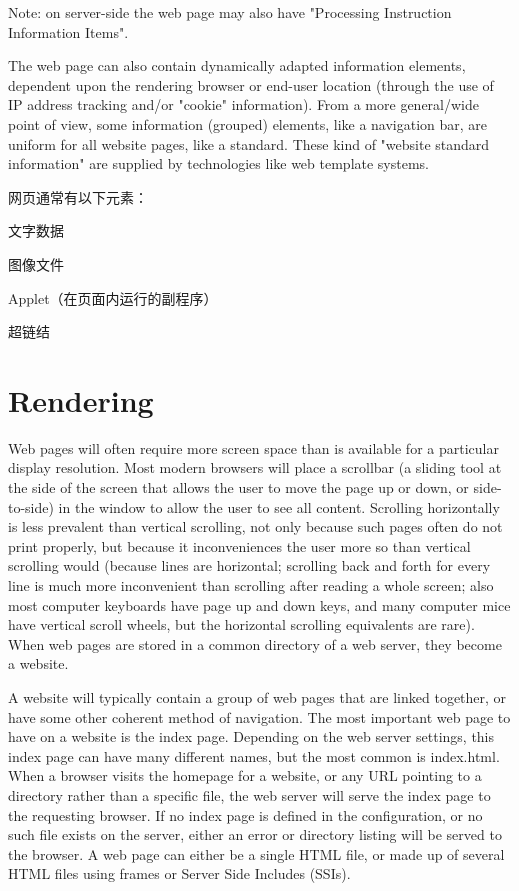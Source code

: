 Note: on server-side the web page may also have "Processing Instruction Information Items".

The web page can also contain dynamically adapted information elements, dependent upon the rendering browser or end-user location (through the use of IP address tracking and/or "cookie" information). From a more general/wide point of view, some information (grouped) elements, like a navigation bar, are uniform for all website pages, like a standard. These kind of "website standard information" are supplied by technologies like web template systems.

网页通常有以下元素：

\begin{compactitem}
\item 文字数据
\item 图像文件
\item Applet（在页面内运行的副程序）
\item 超链结
\end{compactitem}




\section{Rendering}

Web pages will often require more screen space than is available for a particular display resolution. Most modern browsers will place a scrollbar (a sliding tool at the side of the screen that allows the user to move the page up or down, or side-to-side) in the window to allow the user to see all content. Scrolling horizontally is less prevalent than vertical scrolling, not only because such pages often do not print properly, but because it inconveniences the user more so than vertical scrolling would (because lines are horizontal; scrolling back and forth for every line is much more inconvenient than scrolling after reading a whole screen; also most computer keyboards have page up and down keys, and many computer mice have vertical scroll wheels, but the horizontal scrolling equivalents are rare). When web pages are stored in a common directory of a web server, they become a website.

A website will typically contain a group of web pages that are linked together, or have some other coherent method of navigation. The most important web page to have on a website is the index page. Depending on the web server settings, this index page can have many different names, but the most common is index.html. When a browser visits the homepage for a website, or any URL pointing to a directory rather than a specific file, the web server will serve the index page to the requesting browser. If no index page is defined in the configuration, or no such file exists on the server, either an error or directory listing will be served to the browser. A web page can either be a single HTML file, or made up of several HTML files using frames or Server Side Includes (SSIs).

